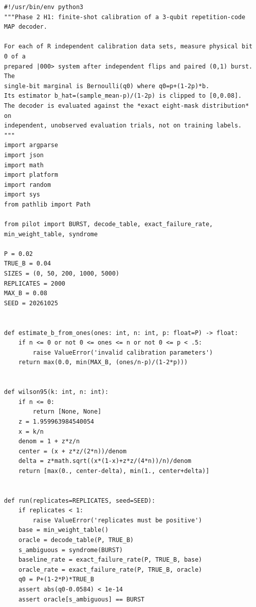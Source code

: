 \documentclass[10pt,a4paper,landscape]{article}
\begin{document}
\begin{verbatim}
#!/usr/bin/env python3
"""Phase 2 H1: finite-shot calibration of a 3-qubit repetition-code MAP decoder.

For each of R independent calibration data sets, measure physical bit 0 of a
prepared |000> system after independent flips and paired (0,1) burst. The
single-bit marginal is Bernoulli(q0) where q0=p+(1-2p)*b.
Its estimator b_hat=(sample_mean-p)/(1-2p) is clipped to [0,0.08].
The decoder is evaluated against the *exact eight-mask distribution* on
independent, unobserved evaluation trials, not on training labels.
"""
import argparse
import json
import math
import platform
import random
import sys
from pathlib import Path

from pilot import BURST, decode_table, exact_failure_rate, min_weight_table, syndrome

P = 0.02
TRUE_B = 0.04
SIZES = (0, 50, 200, 1000, 5000)
REPLICATES = 2000
MAX_B = 0.08
SEED = 20261025


def estimate_b_from_ones(ones: int, n: int, p: float=P) -> float:
    if n <= 0 or not 0 <= ones <= n or not 0 <= p < .5:
        raise ValueError('invalid calibration parameters')
    return max(0.0, min(MAX_B, (ones/n-p)/(1-2*p)))


def wilson95(k: int, n: int):
    if n <= 0:
        return [None, None]
    z = 1.959963984540054
    x = k/n
    denom = 1 + z*z/n
    center = (x + z*z/(2*n))/denom
    delta = z*math.sqrt((x*(1-x)+z*z/(4*n))/n)/denom
    return [max(0., center-delta), min(1., center+delta)]


def run(replicates=REPLICATES, seed=SEED):
    if replicates < 1:
        raise ValueError('replicates must be positive')
    base = min_weight_table()
    oracle = decode_table(P, TRUE_B)
    s_ambiguous = syndrome(BURST)
    baseline_rate = exact_failure_rate(P, TRUE_B, base)
    oracle_rate = exact_failure_rate(P, TRUE_B, oracle)
    q0 = P+(1-2*P)*TRUE_B
    assert abs(q0-0.0584) < 1e-14
    assert oracle[s_ambiguous] == BURST


\end{verbatim}
\end{document}
